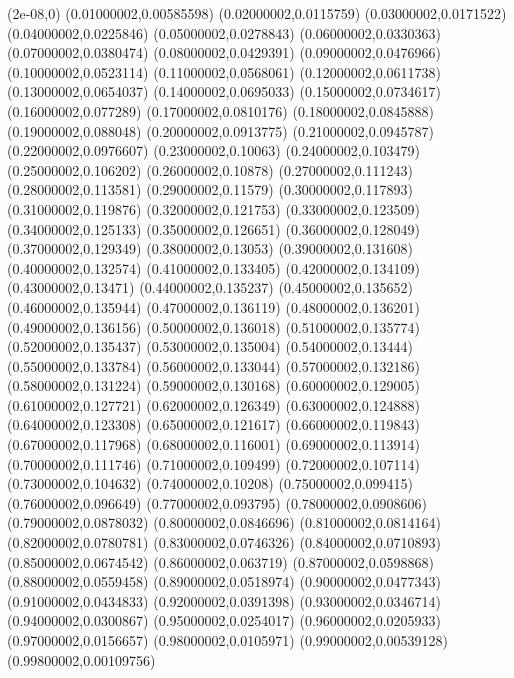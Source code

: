 \expandafter\def\csname heapTam@W_7\endcsname{(2e-08,0) (0.01000002,0.00585598) (0.02000002,0.0115759) (0.03000002,0.0171522) (0.04000002,0.0225846) (0.05000002,0.0278843) (0.06000002,0.0330363) (0.07000002,0.0380474) (0.08000002,0.0429391) (0.09000002,0.0476966) (0.10000002,0.0523114) (0.11000002,0.0568061) (0.12000002,0.0611738) (0.13000002,0.0654037) (0.14000002,0.0695033) (0.15000002,0.0734617) (0.16000002,0.077289) (0.17000002,0.0810176) (0.18000002,0.0845888) (0.19000002,0.088048) (0.20000002,0.0913775) (0.21000002,0.0945787) (0.22000002,0.0976607) (0.23000002,0.10063) (0.24000002,0.103479) (0.25000002,0.106202) (0.26000002,0.10878) (0.27000002,0.111243) (0.28000002,0.113581) (0.29000002,0.11579) (0.30000002,0.117893) (0.31000002,0.119876) (0.32000002,0.121753) (0.33000002,0.123509) (0.34000002,0.125133) (0.35000002,0.126651) (0.36000002,0.128049) (0.37000002,0.129349) (0.38000002,0.13053) (0.39000002,0.131608) (0.40000002,0.132574) (0.41000002,0.133405) (0.42000002,0.134109) (0.43000002,0.13471) (0.44000002,0.135237) (0.45000002,0.135652) (0.46000002,0.135944) (0.47000002,0.136119) (0.48000002,0.136201) (0.49000002,0.136156) (0.50000002,0.136018) (0.51000002,0.135774) (0.52000002,0.135437) (0.53000002,0.135004) (0.54000002,0.13444) (0.55000002,0.133784) (0.56000002,0.133044) (0.57000002,0.132186) (0.58000002,0.131224) (0.59000002,0.130168) (0.60000002,0.129005) (0.61000002,0.127721) (0.62000002,0.126349) (0.63000002,0.124888) (0.64000002,0.123308) (0.65000002,0.121617) (0.66000002,0.119843) (0.67000002,0.117968) (0.68000002,0.116001) (0.69000002,0.113914) (0.70000002,0.111746) (0.71000002,0.109499) (0.72000002,0.107114) (0.73000002,0.104632) (0.74000002,0.10208) (0.75000002,0.099415) (0.76000002,0.096649) (0.77000002,0.093795) (0.78000002,0.0908606) (0.79000002,0.0878032) (0.80000002,0.0846696) (0.81000002,0.0814164) (0.82000002,0.0780781) (0.83000002,0.0746326) (0.84000002,0.0710893) (0.85000002,0.0674542) (0.86000002,0.063719) (0.87000002,0.0598868) (0.88000002,0.0559458) (0.89000002,0.0518974) (0.90000002,0.0477343) (0.91000002,0.0434833) (0.92000002,0.0391398) (0.93000002,0.0346714) (0.94000002,0.0300867) (0.95000002,0.0254017) (0.96000002,0.0205933) (0.97000002,0.0156657) (0.98000002,0.0105971) (0.99000002,0.00539128) (0.99800002,0.00109756)}

